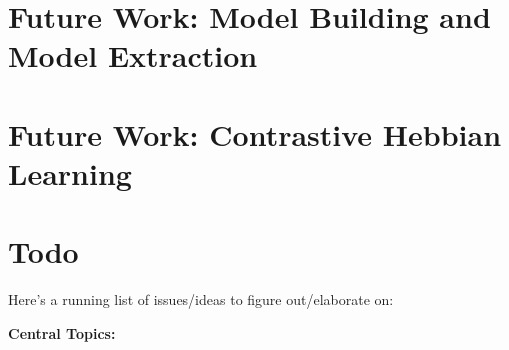 \documentclass[12pt]{article}
\theoremstyle{definition}
\begin{document}
\section{\textcolor{myblue}{Future Work:  Model Building and Model Extraction}}

\section{\textcolor{myblue}{Future Work:  Contrastive Hebbian Learning}}

\section{\textcolor{myblue}{Todo}}

Here's a running list of issues/ideas to figure out/elaborate on:

\textbf{\textcolor{myblue}{Central Topics:}}
\end{document}
